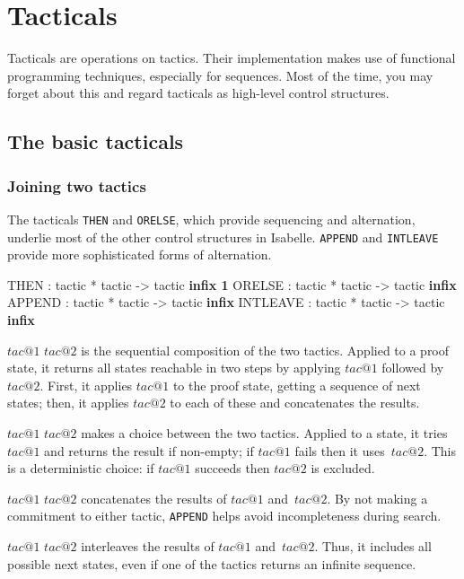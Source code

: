 \chapter{Tacticals}
Tacticals are operations on tactics.  Their implementation makes use of
functional programming techniques, especially for sequences.  Most of the
time, you may forget about this and regard tacticals as high-level control
structures.

\section{The basic tacticals}
\subsection{Joining two tactics}
The tacticals {\tt THEN} and {\tt ORELSE}, which provide sequencing and
alternation, underlie most of the other control structures in Isabelle.
{\tt APPEND} and {\tt INTLEAVE} provide more sophisticated forms of
alternation.
\begin{ttbox} 
THEN     : tactic * tactic -> tactic                 \hfill{\bf infix 1}
ORELSE   : tactic * tactic -> tactic                 \hfill{\bf infix}
APPEND   : tactic * tactic -> tactic                 \hfill{\bf infix}
INTLEAVE : tactic * tactic -> tactic                 \hfill{\bf infix}
\end{ttbox}
\begin{ttdescription}
\item[$tac@1$ \ttindexbold{THEN} $tac@2$] 
is the sequential composition of the two tactics.  Applied to a proof
state, it returns all states reachable in two steps by applying $tac@1$
followed by~$tac@2$.  First, it applies $tac@1$ to the proof state, getting a
sequence of next states; then, it applies $tac@2$ to each of these and
concatenates the results.

\item[$tac@1$ \ttindexbold{ORELSE} $tac@2$] 
makes a choice between the two tactics.  Applied to a state, it
tries~$tac@1$ and returns the result if non-empty; if $tac@1$ fails then it
uses~$tac@2$.  This is a deterministic choice: if $tac@1$ succeeds then
$tac@2$ is excluded.

\item[$tac@1$ \ttindexbold{APPEND} $tac@2$] 
concatenates the results of $tac@1$ and~$tac@2$.  By not making a commitment
to either tactic, {\tt APPEND} helps avoid incompleteness during
search.

\item[$tac@1$ \ttindexbold{INTLEAVE} $tac@2$] 
interleaves the results of $tac@1$ and~$tac@2$.  Thus, it includes all
possible next states, even if one of the tactics returns an infinite
sequence.
\end{ttdescription}


